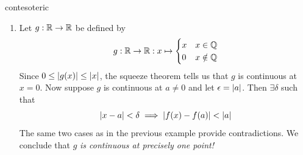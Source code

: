 \begin{examples}{}{contesoteric}
\begin{enumerate}
		\item\label{ex:contonepoint} Let $g:\mathbb{R}\to\mathbb{R}$ be defined by
		\[
			g:\mathbb{R}\to\mathbb{R}:x\mapsto
			\begin{cases}
				x&x\in\mathbb{Q}\\
				0&x\notin\mathbb{Q}
			\end{cases}
		\]
		Since $0\le \left| g(x)\right|\le \left| x\right|$, the squeeze theorem tells us that $g$ is continuous at $x=0$.\smallbreak
		Now suppose $g$ is continuous at $a\neq 0$ and let $\epsilon=\left| a\right|$. Then $\exists\delta$ such that
		\[
			\left| x-a\right|<\delta\implies \left| f(x)-f(a)\right|<\left| a\right|
		\]
		The same two cases as in the previous example provide contradictions. We conclude that $g$ \emph{is continuous at precisely one point!}

\end{enumerate}

\end{examples}


\goodbreak




